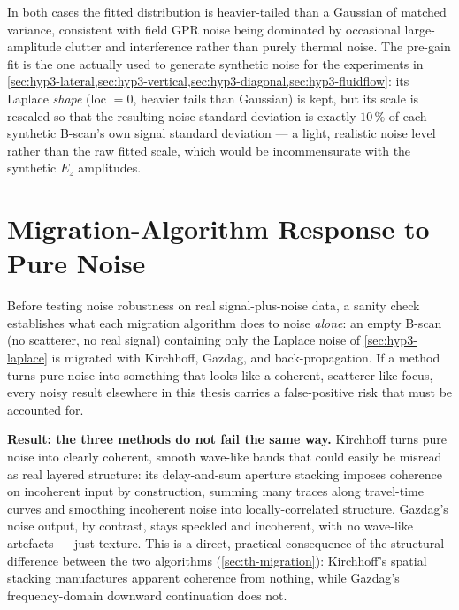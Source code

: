 In both cases the fitted distribution is heavier-tailed than a Gaussian of
matched variance, consistent with field GPR noise being dominated by
occasional large-amplitude clutter and interference rather than purely
thermal noise. The pre-gain fit is the one actually used to generate
synthetic noise for the experiments in \cref{sec:hyp3-lateral,sec:hyp3-vertical,sec:hyp3-diagonal,sec:hyp3-fluidflow}:
its Laplace \emph{shape} (loc $=0$, heavier tails than Gaussian) is kept,
but its scale is rescaled so that the resulting noise standard deviation is
exactly $10\,\%$ of each synthetic B-scan's own signal standard deviation
--- a light, realistic noise level rather than the raw fitted scale, which
would be incommensurate with the synthetic $E_z$ amplitudes.

\section{Migration-Algorithm Response to Pure Noise}
\label{sec:hyp3-purenoise}

Before testing noise robustness on real signal-plus-noise data, a sanity
check establishes what each migration algorithm does to noise \emph{alone}:
an empty B-scan (no scatterer, no real signal) containing only the Laplace
noise of \cref{sec:hyp3-laplace} is migrated with Kirchhoff, Gazdag, and
back-propagation. If a method turns pure noise into something that looks
like a coherent, scatterer-like focus, every noisy result elsewhere in this
thesis carries a false-positive risk that must be accounted for.

\textbf{Result: the three methods do not fail the same way.} Kirchhoff
turns pure noise into clearly coherent, smooth wave-like bands that could
easily be misread as real layered structure: its delay-and-sum aperture
stacking imposes coherence on incoherent input by construction, summing
many traces along travel-time curves and smoothing incoherent noise into
locally-correlated structure. Gazdag's noise output, by contrast, stays
speckled and incoherent, with no wave-like artefacts --- just texture. This
is a direct, practical consequence of the structural difference between the
two algorithms (\cref{sec:th-migration}): Kirchhoff's spatial stacking
manufactures apparent coherence from nothing, while Gazdag's
frequency-domain downward continuation does not.


